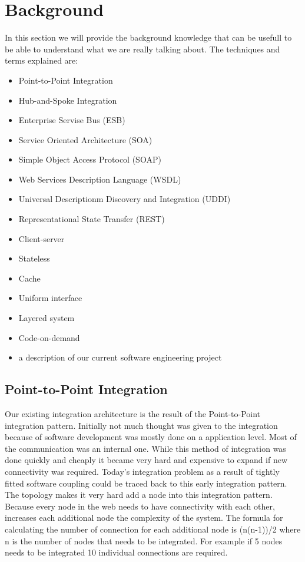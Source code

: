 \documentclass{llncs}
\begin{document}
\newpage
\setcounter{tocdepth}{3}
\tableofcontents
\newpage

\section{Background}
In this section we will provide the background knowledge that can be usefull to be able to understand what we are really talking about.
The techniques and terms explained are:
\begin{itemize}
\item Point-to-Point Integration
\item Hub-and-Spoke Integration
\item Enterprise Servise Bus (ESB)
\item Service Oriented Architecture (SOA)
\item Simple Object Access Protocol (SOAP)
\item Web Services Description Language (WSDL)
\item Universal Descriptionm Discovery and Integration (UDDI)
\item Representational State Transfer (REST)
\item Client-server
\item Stateless
\item Cache
\item Uniform interface
\item Layered system
\item Code-on-demand
\item a description of our current software engineering project
\end{itemize}

\label{sec:background}

\subsection{Point-to-Point Integration}
Our existing integration architecture is the result of the Point-to-Point integration pattern. Initially not much thought was given to the integration because of software development was mostly done on a application level. Most of the communication was an internal one. While this method of integration was done quickly and cheaply it became very hard and expensive to expand if new connectivity was required. Today's integration problem as a result of tightly fitted software coupling could be traced back to this early integration pattern. The topology makes it very hard add a node into this integration pattern. Because every node in the web needs to have connectivity with each other, increases each additional node the complexity of the system. The  formula for calculating the number of connection for each additional node is (n(n-1))/2 where n is the number of nodes that needs to be integrated. For example if 5 nodes needs to be integrated 10 individual connections are required.
\end{document}
